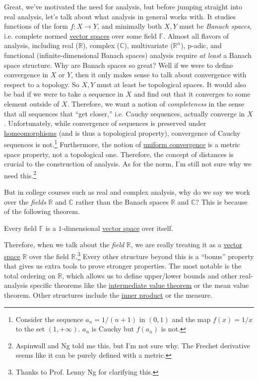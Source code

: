 Great, we've motivated the need for analysis, but before jumping straight into real analysis, let's talk about what analysis in general works with. It studies functions of the form $f: X \rightarrow Y$, and minimally both $X, Y$ must be \textit{Banach spaces}, i.e. complete normed \hyperref[lin-def:vector-space]{vector spaces} over some field $\mathbb{F}$. Almost all flavors of analysis, including real ($\mathbb{R}$), complex ($\mathbb{C}$), multivariate ($\mathbb{R}^n$), p-adic, and functional (infinite-dimensional Banach spaces) analysis require \textit{at least} a Banach space structure. Why are Banach spaces so great? Well if we were to define convergence in $X$ or $Y$, then it only makes sense to talk about convergence with respect to a topology. So $X, Y$ must at least be topological spaces. It would also be bad if we were to take a sequence in $X$ and find out that it converges to some element outside of $X$. Therefore, we want a notion of \textit{completeness} in the sense that all sequences that ``get closer,'' i.e. Cauchy sequences, actually converge in $X$. Unfortunately, while convergence of sequences is preserved under \hyperref[pst-def:homeomorphism]{homeomorphisms} (and is thus a topological property), convergence of Cauchy sequences is not.\footnote{Consider the sequence $a_n = 1/(n+1)$ in $(0, 1)$ and the map $f(x) = 1/x$ to the set $(1, +\infty)$. $a_n$ is Cauchy but $f(a_n)$ is not.} Furthermore, the notion of \hyperref[pst-def:uniform-convergence]{uniform convergence} is a metric space property, not a topological one. Therefore, the concept of distances is crucial to the construction of analysis. As for the norm, I'm still not sure why we need this.\footnote{Aspinwall and Ng told me this, but I'm not sure why. The Frechet derivative seems like it can be purely defined with a metric. } 

But in college courses such as real and complex analysis, why do we say we work over the \textit{fields} $\mathbb{R}$ and $\mathbb{C}$ rather than the Banach spaces $\mathbb{R}$ and $\mathbb{C}$? This is because of the following theorem. 

\begin{theorem}
  \label{thm:a-field-as-a-one-dimensional-vector-space}
  Every field $\mathbb{F}$ is a $1$-dimensional \hyperref[lin-def:vector-space]{vector space} over itself. 
\end{theorem}

Therefore, when we talk about the \textit{field} $\mathbb{R}$, we are really treating it as a \hyperref[lin-def:vector-space]{vector space} $\mathbb{R}$ over the field $\mathbb{R}$.\footnote{Thanks to Prof. Lenny Ng for clarifying this.} Every other structure beyond this is a ``bonus'' property that gives us extra tools to prove stronger properties. The most notable is the total ordering on $\mathbb{R}$, which allows us to define upper/lower bounds and other real-analysis specific theorems like the \hyperref[pst-thm:intermediate-value-theorem]{intermediate value theorem} or the mean value theorem. Other structures include the \hyperref[lin-def:inner-product]{inner product} or the measure. 

